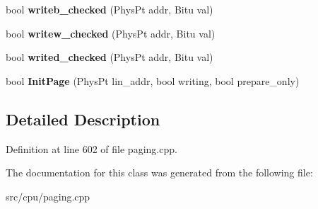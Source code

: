 \begin{DoxyCompactItemize}
\item 
\hypertarget{classNewInitPageHandler_a342ecdf4f9a89943a737464c4f86012e}{bool {\bfseries writeb\-\_\-checked} (Phys\-Pt addr, Bitu val)}\label{classNewInitPageHandler_a342ecdf4f9a89943a737464c4f86012e}

\item 
\hypertarget{classNewInitPageHandler_a03301e03d6dc87b05c36b29685b30d92}{bool {\bfseries writew\-\_\-checked} (Phys\-Pt addr, Bitu val)}\label{classNewInitPageHandler_a03301e03d6dc87b05c36b29685b30d92}

\item 
\hypertarget{classNewInitPageHandler_a192d6438cfe0114d22a2fb7f3329600a}{bool {\bfseries writed\-\_\-checked} (Phys\-Pt addr, Bitu val)}\label{classNewInitPageHandler_a192d6438cfe0114d22a2fb7f3329600a}

\item 
\hypertarget{classNewInitPageHandler_a1ed4fb6bc908d2a5b4a8c0b486be0852}{bool {\bfseries Init\-Page} (Phys\-Pt lin\-\_\-addr, bool writing, bool prepare\-\_\-only)}\label{classNewInitPageHandler_a1ed4fb6bc908d2a5b4a8c0b486be0852}

\end{DoxyCompactItemize}


\subsection{Detailed Description}


Definition at line 602 of file paging.\-cpp.



The documentation for this class was generated from the following file\-:\begin{DoxyCompactItemize}
\item 
src/cpu/paging.\-cpp\end{DoxyCompactItemize}
